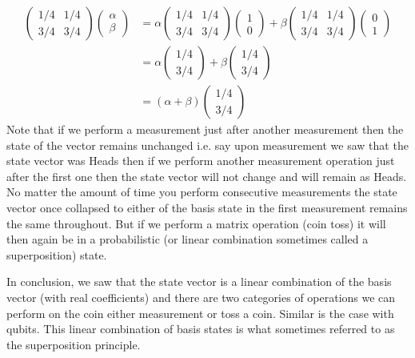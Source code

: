 \documentclass[12pt, oneside]{book}
\theoremstyle{definition}
\theoremstyle{definition}
\theoremstyle{remark}
\begin{document}
\begin{align*}
\begin{pmatrix} 1/4 & 1/4 \\3/4 & 3/4 \end{pmatrix} \begin{pmatrix} \alpha \\ \beta \end{pmatrix} &= \alpha \begin{pmatrix} 1/4 & 1/4 \\3/4 & 3/4 \end{pmatrix} \begin{pmatrix} 1 \\ 0 \end{pmatrix} + \beta \begin{pmatrix} 1/4 & 1/4 \\3/4 & 3/4 \end{pmatrix} \begin{pmatrix} 0 \\ 1 \end{pmatrix}\\
&= \alpha \begin{pmatrix} 1/4 \\ 3/4 \end{pmatrix} + \beta \begin{pmatrix} 1/4 \\ 3/4 \end{pmatrix}\\
&=(\alpha + \beta) \begin{pmatrix} 1/4 \\ 3/4 \end{pmatrix}
\end{align*}
Note that if we perform a measurement just after another measurement then the state of the vector remains unchanged i.e. say upon measurement we saw that the state vector was Heads then if we perform another measurement operation just after the first one then the state vector will not change and will remain as Heads. No matter the amount of time you perform consecutive measurements the state vector once collapsed to either of the basis state in the first measurement remains the same throughout. But if we perform a matrix operation (coin toss) it will then again be in a probabilistic (or linear combination sometimes called a superposition) state.

In conclusion, we saw that the state vector is a linear combination of the basis vector (with real coefficients) and there are two categories of operations we can perform on the coin either measurement or toss a coin. Similar is the case with qubits. This linear combination of basis states is what sometimes referred to as the superposition principle.
\end{document}
